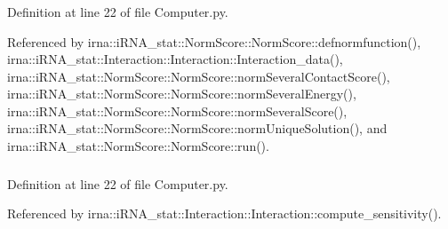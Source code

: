 \hypertarget{classirna_1_1iRNA__stat_1_1Computer_1_1Computer_a15e31f32b9447cc769bc2630dabfeb8c}{
\subsubsection[{pos}]{}}
\label{classirna_1_1iRNA__stat_1_1Computer_1_1Computer_a15e31f32b9447cc769bc2630dabfeb8c}


\-Definition at line 22 of file \-Computer.\-py.



\-Referenced by irna\-::i\-R\-N\-A\-\_\-stat\-::\-Norm\-Score\-::\-Norm\-Score\-::defnormfunction(), irna\-::i\-R\-N\-A\-\_\-stat\-::\-Interaction\-::\-Interaction\-::\-Interaction\-\_\-data(), irna\-::i\-R\-N\-A\-\_\-stat\-::\-Norm\-Score\-::\-Norm\-Score\-::norm\-Several\-Contact\-Score(), irna\-::i\-R\-N\-A\-\_\-stat\-::\-Norm\-Score\-::\-Norm\-Score\-::norm\-Several\-Energy(), irna\-::i\-R\-N\-A\-\_\-stat\-::\-Norm\-Score\-::\-Norm\-Score\-::norm\-Several\-Score(), irna\-::i\-R\-N\-A\-\_\-stat\-::\-Norm\-Score\-::\-Norm\-Score\-::norm\-Unique\-Solution(), and irna\-::i\-R\-N\-A\-\_\-stat\-::\-Norm\-Score\-::\-Norm\-Score\-::run().

\hypertarget{classirna_1_1iRNA__stat_1_1Computer_1_1Computer_a270c30e32be99028b0b933cc7f601a37}{
\subsubsection[{ppv}]{}}
\label{classirna_1_1iRNA__stat_1_1Computer_1_1Computer_a270c30e32be99028b0b933cc7f601a37}


\-Definition at line 22 of file \-Computer.\-py.



\-Referenced by irna\-::i\-R\-N\-A\-\_\-stat\-::\-Interaction\-::\-Interaction\-::compute\-\_\-sensitivity().

